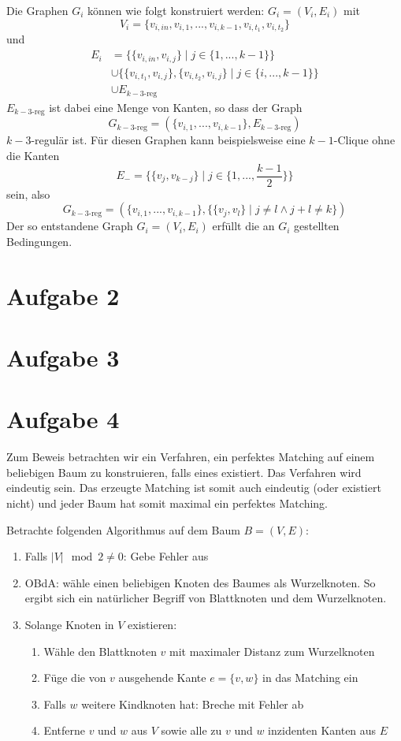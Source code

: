 \documentclass[a4paper]{article}
\begin{document}
Die Graphen $G_i$ können wie folgt konstruiert werden:
$G_i = (V_i, E_i)$ mit
\[
	V_i = \{ v_{i,in}, v_{i, 1}, ..., v_{i, k-1}, v_{i, t_1}, v_{i, t_2} \}
\]
und
\begin{align*}
E_i &= \{ \{ v_{i, in}, v_{i, j} \} \mid j \in \{ 1, ..., k-1 \} \} \\
	&\cup \{ \{ v_{i, t_1}, v_{i, j} \}, \{ v_{i, t_2}, v_{i, j} \} \mid j \in \{ i, ..., k-1 \} \} \\
	&\cup E_{k-3\text{-reg}}
\end{align*}
$E_{k-3\text{-reg}}$ ist dabei eine Menge von Kanten, so dass der Graph
\[
	G_{k-3\text{-reg}} = (\{v_{i, 1}, ..., v_{i, k-1}\}, E_{k-3\text{-reg}})
\]
$k-3$-regulär ist. Für diesen Graphen kann beispielsweise eine $k-1$-Clique
ohne die Kanten
\[
	E_- = \{\{ v_j, v_{k-j} \} \mid j \in \{1, ..., \frac{k-1}{2}\}\}
\]
sein, also 
\[
	G_{k-3\text{-reg}} = (\{v_{i, 1}, ..., v_{i, k-1}\}, \{ \{ v_j, v_l\} \mid j \neq l \wedge j+l \neq k\})
\]
Der so entstandene Graph $G_i = (V_i, E_i)$ erfüllt die an $G_i$ gestellten Bedingungen.

\section{Aufgabe 2}
\section{Aufgabe 3}

\section{Aufgabe 4}

Zum Beweis betrachten wir ein Verfahren, ein perfektes Matching auf einem
beliebigen Baum zu konstruieren, falls eines existiert. Das Verfahren wird
eindeutig sein. Das erzeugte Matching ist somit auch eindeutig (oder 
existiert nicht) und jeder Baum hat somit maximal ein perfektes Matching.

Betrachte folgenden Algorithmus auf dem Baum $B = (V, E)$:
\begin{enumerate}
\item Falls $|V| \mod 2 \neq 0$: Gebe Fehler aus
\item OBdA: wähle einen beliebigen Knoten des Baumes als Wurzelknoten. So
ergibt sich ein natürlicher Begriff von Blattknoten und dem Wurzelknoten.
\item Solange Knoten in $V$ existieren:
	\begin{enumerate}
	\item Wähle den Blattknoten $v$ mit maximaler Distanz zum Wurzelknoten
	\item Füge die von $v$ ausgehende Kante $e = \{v, w\}$ in das Matching ein
	\item Falls $w$ weitere Kindknoten hat: Breche mit Fehler ab
	\item Entferne $v$ und $w$ aus $V$ sowie alle zu $v$ und $w$ inzidenten
	Kanten aus $E$
	\end{enumerate}
\end{enumerate}
\end{document}
